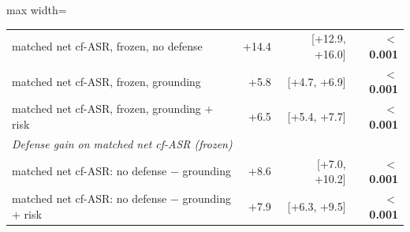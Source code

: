 \begin{table}[t]
{\begin{adjustbox}{max width=\linewidth}
\begin{tabular}{lrrr}
matched net cf-ASR, frozen, no defense & +14.4 & [+12.9, +16.0] & \textbf{$<$0.001} \\
matched net cf-ASR, frozen, grounding & +5.8 & [+4.7, +6.9] & \textbf{$<$0.001} \\
matched net cf-ASR, frozen, grounding + risk & +6.5 & [+5.4, +7.7] & \textbf{$<$0.001} \\
\midrule
\multicolumn{4}{l}{\textit{Defense gain on matched net cf-ASR (frozen)}} \\
matched net cf-ASR: no defense $-$ grounding & +8.6 & [+7.0, +10.2] & \textbf{$<$0.001} \\
matched net cf-ASR: no defense $-$ grounding + risk & +7.9 & [+6.3, +9.5] & \textbf{$<$0.001} \\
\bottomrule
\end{tabular}
\end{adjustbox}
}
\end{table}